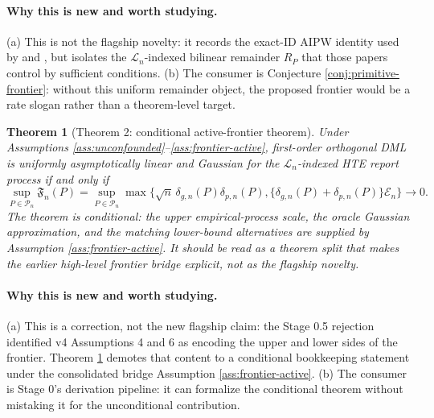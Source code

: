 \documentclass[11pt]{article}
\theoremstyle{definition}
\theoremstyle{plain}
\newtheorem{theorem}{Theorem}
\theoremstyle{remark}
\begin{document}
\paragraph{Why this is new and worth studying.}
(a) This is not the flagship novelty: it records the exact-ID AIPW identity used
by \citet{ChernozhukovEtAl2018DML} and \citet{SemenovaChernozhukov2021DMLCATE},
but isolates the \(\mathcal{L}_n\)-indexed bilinear remainder \(R_P\) that those
papers control by sufficient conditions.  (b) The consumer is Conjecture
\ref{conj:primitive-frontier}: without this uniform remainder object, the proposed
frontier would be a rate slogan rather than a theorem-level target.

\begin{theorem}[Theorem 2: conditional active-frontier theorem]\label{thm:conditional-frontier}
Under Assumptions \ref{ass:unconfounded}--\ref{ass:frontier-active},
first-order orthogonal DML is uniformly asymptotically linear and Gaussian for
the \(\mathcal{L}_n\)-indexed HTE report process if and only if
\[
\sup_{P\in\mathcal{P}_n}\mathfrak{F}_n(P)
=\sup_{P\in\mathcal{P}_n}\max\{\sqrt n\,\delta_{g,n}(P)\delta_{p,n}(P),
\{\delta_{g,n}(P)+\delta_{p,n}(P)\}\mathcal{E}_n\}
\longrightarrow0 .
\]
The theorem is conditional: the upper empirical-process scale, the oracle
Gaussian approximation, and the matching lower-bound alternatives are supplied
by Assumption \ref{ass:frontier-active}.  It should be read as a theorem split
that makes the earlier high-level frontier bridge explicit, not as the
flagship novelty.
\end{theorem}
\paragraph{Why this is new and worth studying.}
(a) This is a correction, not the new flagship claim: the Stage 0.5 rejection
identified v4 Assumptions 4 and 6 as encoding the upper and lower sides of the
frontier.  Theorem
\ref{thm:conditional-frontier} demotes that content to a conditional
bookkeeping statement under the consolidated bridge Assumption
\ref{ass:frontier-active}.  (b) The consumer is Stage 0's derivation pipeline:
it can formalize the conditional theorem without mistaking it for the
unconditional contribution.
\end{document}
